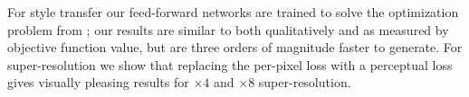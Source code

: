 \documentclass[runningheads]{llncs}
\begin{document}
For style transfer our feed-forward networks are trained to solve the optimization problem from
\cite{gatys2015neural}; our results are similar to \cite{gatys2015neural} both qualitatively and as
measured by objective function value, but are three orders
of magnitude faster to generate. For super-resolution we show that replacing the
per-pixel loss with a perceptual loss gives visually pleasing results for $\times4$ and $\times8$
super-resolution.


% 





\end{document}
